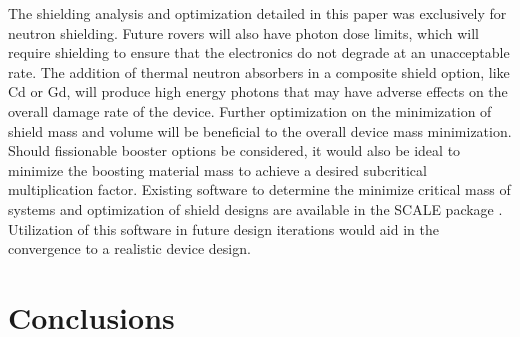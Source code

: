 \documentclass{mc2015}
\begin{document}
The shielding analysis and optimization detailed in this paper was exclusively for neutron shielding. Future rovers will also have photon dose limits, which will require shielding to ensure that the electronics do not degrade at an unacceptable rate. The addition of thermal neutron absorbers in a composite shield option, like Cd or Gd, will produce high energy photons that may have adverse effects on the overall damage rate of the device. 
Further optimization on the minimization of shield mass and volume will be beneficial to the overall device mass minimization. Should fissionable booster options be considered, it would also be ideal to minimize the boosting material mass to achieve a desired subcritical multiplication factor. Existing software to determine the minimize critical mass \cite{goluoglu_smoresnew_2002,karni_semi-automated_keff,karni_smores_2003} of systems and optimization of shield designs \cite{greenspan_material_1994,greenspan_swans:_2001} are available in the SCALE package \cite{bowman_scale_2003}. Utilization of this software in future design iterations would aid in the convergence to a realistic device design.  

\section{Conclusions}
\end{document}
